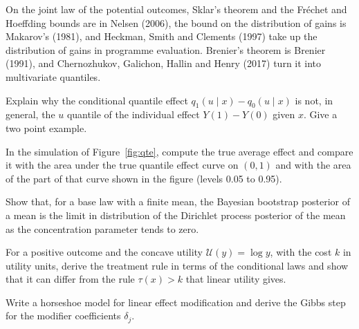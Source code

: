 On the joint law of the potential outcomes, Sklar's theorem and the Fr\'echet and Hoeffding bounds are in Nelsen (2006), the bound on the distribution of gains is Makarov's (1981), and Heckman, Smith and Clements (1997) take up the distribution of gains in programme evaluation.  Brenier's theorem is Brenier (1991), and Chernozhukov, Galichon, Hallin and Henry (2017) turn it into multivariate quantiles. 



\begin{exercises}
\item\label{ex:ch08:3} Explain why the conditional quantile effect $q_1(u \mid x) - q_0(u \mid x)$ is not, in general, the $u$ quantile of the individual effect $Y(1) - Y(0)$ given $x$. Give a two point example.
\item\label{ex:ch08:4} In the simulation of Figure~\ref{fig:qte}, compute the true average effect and compare it with the area under the true quantile effect curve on $(0, 1)$ and with the area of the part of that curve shown in the figure (levels 0.05 to 0.95).
\item\label{ex:ch08:5} Show that, for a base law with a finite mean, the Bayesian bootstrap posterior of a mean is the limit in distribution of the Dirichlet process posterior of the mean as the concentration parameter tends to zero.
\item\label{ex:ch08:6} For a positive outcome and the concave utility $\mathcal{U}(y) = \log y$, with the cost $k$ in utility units, derive the treatment rule in terms of the conditional laws and show that it can differ from the rule $\tau(x) > k$ that linear utility gives.
\item\label{ex:ch08:7} Write a horseshoe model for linear effect modification and derive the Gibbs step for the modifier coefficients $\delta_j$.


\end{exercises}
